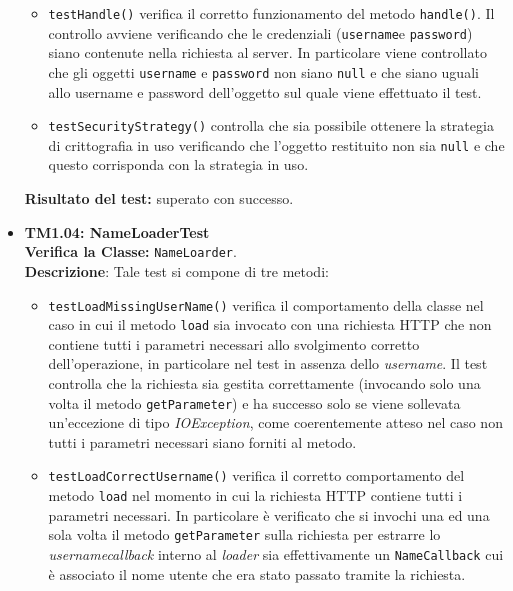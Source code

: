 \begin{itemize}
\begin{itemize}
\item \texttt{testHandle()} verifica il corretto funzionamento del metodo \texttt{handle()}. Il controllo avviene verificando che le credenziali (\texttt{username}e \texttt{password}) siano contenute nella richiesta al server. In particolare viene controllato che gli oggetti \texttt{username} e \texttt{password} non siano \texttt{null} e che siano uguali allo username e password dell'oggetto sul quale viene effettuato il test.


\item \texttt{testSecurityStrategy()} controlla che sia possibile ottenere la strategia di crittografia in uso verificando che l'oggetto restituito non sia \texttt{null} e che questo corrisponda con la strategia in uso.

\end{itemize}
\textbf{Risultato del test:} superato con successo.


\item \textbf{TM1.04: NameLoaderTest}\\
\textbf{Verifica la Classe:} \texttt{NameLoarder}.\\
\textbf{Descrizione}: %
Tale test si compone di tre metodi:
\begin{itemize}

\item \texttt{testLoadMissingUserName()} verifica il comportamento della classe nel caso in cui il metodo \texttt{load} sia invocato con una richiesta HTTP che non contiene tutti i parametri necessari allo svolgimento corretto dell'operazione, in particolare nel test in assenza dello \textit{username}. Il test controlla che la richiesta sia gestita correttamente (invocando solo una volta il metodo \texttt{getParameter}) e ha successo solo se viene sollevata un'eccezione di tipo \textit{IOException}, come coerentemente atteso nel caso non tutti i parametri necessari siano forniti al metodo.

\item \texttt{testLoadCorrectUsername()} verifica il corretto comportamento del metodo \texttt{load} nel momento in cui la richiesta HTTP contiene tutti i parametri necessari. In particolare è verificato che si invochi una ed una sola volta il metodo \texttt{getParameter} sulla richiesta per estrarre lo \textit{username}\textit{callback} interno al \textit{loader} sia effettivamente un \texttt{NameCallback} cui è associato il nome utente che era stato passato tramite la richiesta.


\end{itemize}
\end{itemize}
